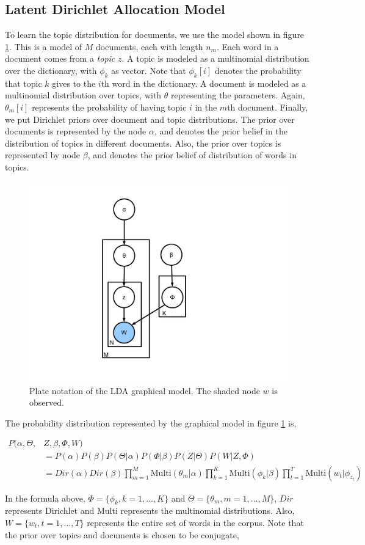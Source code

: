 \documentclass[twoside,12pt]{article}
\begin{document}
\subsection{Latent Dirichlet Allocation Model}
To learn the topic distribution for documents, we use the model shown in figure \ref{figGM}. This is a model of $M$ documents, each with length $n_m$. Each word in a document comes from a \emph{topic} $z$. A topic is modeled as a multinomial distribution over the dictionary, with $\phi_k$ as vector. Note that $\phi_k[i]$ denotes the probability that topic $k$ gives to the $i$th word in the dictionary. A document is modeled as a multinomial distribution over topics, with $\theta$ representing the parameters. Again, $\theta_m[i]$ represents the probability of having topic $i$ in the $m$th document. Finally, we put Dirichlet priors over document and topic distributions. The prior over documents is represented by the node $\alpha$, and denotes the prior belief in the distribution of topics in different documents. Also, the prior over topics is represented by node $\beta$, and denotes the prior belief of distribution of words in topics.

\begin{figure}[h!]
\centering
\includegraphics[width=.3\textwidth]{./figs/gm.pdf}
\caption{Plate notation of the LDA graphical model. The shaded node $w$ is observed. }
\label{figGM}
\end{figure}

The probability distribution represented by the graphical model in figure \ref{figGM} is,

\begin{align}
P(\alpha,\Theta,&Z,\beta,\Phi,W)  \\  &=P(\alpha) P(\beta) P(\Theta | \alpha) P(\Phi|\beta) P(Z|\Theta) P(W|Z,\Phi) \\ &= Dir(\alpha) Dir(\beta) \prod_{m=1}^M \text{Multi}(\theta_m | \alpha) \prod_{k=1}^K \text{Multi}(\phi_k | \beta) \prod_{t=1}^T \text{Multi}(w_t | \phi_{z_t})
\end{align}
 
 In the formula above, $\Phi = \{\phi_k, k=1,\ldots,K\}$ and $\Theta=\{\theta_m, m=1,\ldots,M\}$, $Dir$ represents Dirichlet and Multi represents the multinomial distributions. Also, $W = \{w_t, t=1,\ldots,T\}$ represents the entire set of words in the corpus. Note that the prior over topics and documents is chosen to be conjugate,
 
\end{document}
